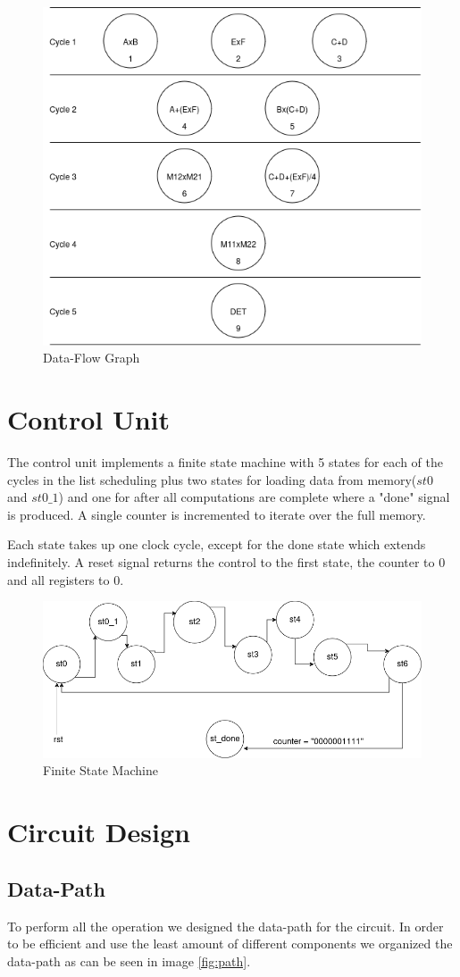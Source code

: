 \documentclass[12pt]{article}
\begin{document}
\begin{figure}[H]
	\centering
	\includegraphics[width=0.55\linewidth]{Imagens/stop.drawio.png}
	\caption{Data-Flow Graph}
	\label{fig:sch}
\end{figure}

\section{Control Unit}
The control unit implements a finite state machine with 5 states for each of the cycles in the list scheduling plus two states for loading data from memory($st0$ and $st0\_1$) and one for after all computations are complete where a "done" signal is produced. A single counter is incremented to iterate over the full memory.

Each state takes up one clock cycle, except for the done state which extends indefinitely. A reset signal returns the control to the first state, the counter to 0 and all registers to 0.

\begin{figure}[H]
	\centering
	\includegraphics[width=0.55\linewidth]{Imagens/FSM_lab2.drawio.png}
	\caption{Finite State Machine}
	\label{fig:fsm}
\end{figure}

\section{Circuit Design}
\subsection{Data-Path}
To perform all the operation we designed the data-path for the circuit. In order to be efficient and use the least amount of different components we organized the data-path as can be seen in image \ref{fig:path}. 
\end{document}
